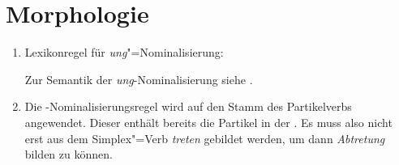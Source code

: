 \section{Morphologie}



\begin{enumerate}
\item

\eas
Lexikonregel für \emph{ung}"=Nominalisierung:\\
\label{lr-ung-nom}%
\zs

Zur Semantik der \emph{ung}-Nominalisierung siehe .

\item Die -Nominalisierungsregel wird auf den Stamm des Partikelverbs angewendet. Dieser
  enthält bereits die Partikel in der \subcatl. Es muss also nicht erst aus dem Simplex"=Verb
  \emph{treten}  gebildet werden, um dann \emph{Abtretung} bilden zu können.

\end{enumerate}

